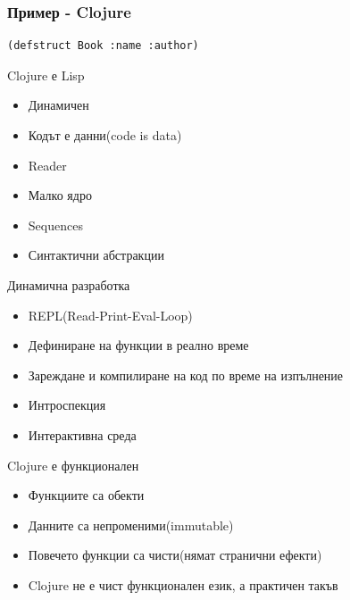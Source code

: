 \documentclass[compress,red]{beamer}
\begin{document}
\begin{frame}[fragile]
  \frametitle{Пример - Clojure}
  \transdissolve
\begin{lstlisting}
(defstruct Book :name :author)
\end{lstlisting}
\end{frame}


\begin{frame}{Clojure е Lisp}
  \transdissolve
  \begin{itemize}
  \item Динамичен
  \item Кодът е данни(code is data)
  \item Reader
  \item Малко ядро
  \item Sequences
  \item Синтактични абстракции
  \end{itemize}
\end{frame}

\begin{frame}{Динамична разработка}
  \transdissolve
  \begin{itemize}
  \item REPL(Read-Print-Eval-Loop)
  \item Дефиниране на функции в реално време
  \item Зареждане и компилиране на код по време на изпълнение
  \item Интроспекция
  \item Интерактивна среда
  \end{itemize}
\end{frame}

\begin{frame}{Clojure е функционален}
  \transdissolve
  \begin{itemize}
  \item Функциите са обекти
  \item Данните са непроменими(immutable)
  \item Повечето функции са чисти(нямат странични ефекти)
  \item Clojure не е чист функционален език, а практичен такъв
  \end{itemize}
\end{frame}
\end{document}
